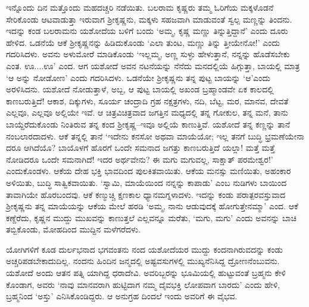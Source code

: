 ಇನ್ನೊಂದು ದಿನ ಮತ್ತೊಂದು ಮಹದಚ್ಚರಿ ನಡೆಯಿತು. ಬಲರಾಮ ಕೃಷ್ಣರು ತಮ್ಮ ಓರಿಗೆಯ ಮಕ್ಕಳೊಡನೆ ಸೇರಿಕೊಂಡು ಆಟವಾಡುತ್ತಾ ಇರುವಾಗ ಶ್ರೀಕೃಷ್ಣನು, ಮಕ್ಕಳು ಸಹಜವಾಗಿ ಮಾಡುವಂತೆ ಸ್ವಲ್ಪ ಮಣ್ಣನ್ನು ತಿಂದನು. ಇದನ್ನು ಕಂಡ ಬಲರಾಮನು ಯಶೋದೆಯ ಬಳಿಗೆ ಬಂದು ‘ಅಮ್ಮ, ಕೃಷ್ಣ ಮಣ್ಣು ತಿನ್ನುತ್ತಿದ್ದಾನೆ’ ಎಂದು ದೂರು ಹೇಳಿದ. ಒಡನೆಯೆ ಆಕೆ ಶ್ರೀಕೃಷ್ಣನನ್ನು ಹಿಡಿದುಕೊಂಡು ‘ಎಲಾ ತುಂಟ, ಮಣ್ಣು ತಿನ್ನು ತ್ತೀಯೇನೋ!’ ಎಂದು ಗದರಿಸಿದಳು. ಅವನು ಅಳುಮೋರೆ ಮಾಡಿಕೊಂಡು ‘ಇಲ್ಲಮ್ಮ, ಅಣ್ಣ ಸುಳ್ಳು ಹೇಳುತ್ತಾನೆ, ನನ್ನನ್ನು ಹೊಡೆಸಬೇಕು ಎಂತ. ಊ....ಊ’ ಎಂದ. ಆಗ ಯಶೋದೆ ಅವನ ನಟನೆಯನ್ನು ನೆನೆದು ಮನದಲ್ಲಿಯೆ ಹಿಗ್ಗುತ್ತಾ, ಬಾಯಲ್ಲಿ ಮಾತ್ರ ‘ಆ ಅನ್ನು ನೋಡೋಣ’ ಎಂದು ಗದರಿಸಿದಳು. ಒಡನೆಯೇ ಶ್ರೀಕೃಷ್ಣನು ತನ್ನ ಪುಟ್ಟ ಬಾಯನ್ನು ‘ಆ’ಎಂದು ಅರಳಿಸಿದನು. ಯಶೋದೆ ನೋಡುತ್ತಾಳೆ, ಅಬ್ಬ, ಆ ಪುಟ್ಟ ಬಾಯಲ್ಲಿ ಅಖಂಡ ಬ್ರಹ್ಮಾಂಡವೇ ಏಕ ಕಾಲದಲ್ಲಿ ಕಾಣಬರುತ್ತಿದೆ! ಆಕಾಶ, ದಿಕ್ಕುಗಳು, ಸೂರ್ಯ ಚಂದ್ರಾದಿ ಗ್ರಹ ನಕ್ಷತ್ರಗಳು, ನದಿ, ಬೆಟ್ಟ, ಮರ, ಮಾನವ, ದೇವತೆ ಎಲ್ಲವೂ, ಎಲ್ಲವೂ ಅಲ್ಲಿಯೇ ಇವೆ. ಆ ಚಿತ್ರವಿಚಿತ್ರವಾದ ಜಗತ್ತಿನ ಮಧ್ಯದಲ್ಲಿ ತನ್ನ ಗೋಕುಲ, ತನ್ನ ಮನೆ, ತಾನು ಬಾಯ್ದೆರೆದುಕೊಂಡು ನಿಂತಿರುವ ತನ್ನ ಕಂದ ಶ್ರೀಕೃಷ್ಣ–ಇವೂ ಅಲ್ಲಿಯೆ ಕಾಣುತ್ತಿವೆ. ಯಶೋದೆ ತನ್ನ ಕಣ್ಣನ್ನು ತಾನೆ ನಂಬಲಾರದಾದಳು. ಆಕೆ ತನ್ನಲ್ಲಿ ತಾನೆ ‘ಇದೇನು ಕನಸೋ ಅಥವಾ ಮಾಯೆಯೋ; ಇಲ್ಲ ತನಗೆ ಬುದ್ಧಿ ಭ್ರಮಣೆಯೇನಾ ದರೂ ಆಗಿದೆಯೊ? ಬಾಯೊಳಗೆ ಹೊರಗೆ ಒಂದೇ ಸಮನಾದ ಜಗತ್ತು ಕಾಣಬರುತ್ತಿದೆ ಯಲ್ಲಾ! ಮತ್ತೆ ಮತ್ತೆ ನೋಡಿದರೂ ಒಂದೇ ಸಮನಾಗಿದೆ! ಇದರ ಅರ್ಥವೇನು? ಈ ಮಗು ಮಗುವಲ್ಲ, ಸಾಕ್ಷಾತ್ ಪರಮೇಶ್ವರ!’ ಎಂದುಕೊಂಡಳು. ಆಕೆಯ ದೇಹ ಭಕ್ತಿ ಭಾವದಿಂದ ಪುಲಕಿತವಾಯಿತು. ಆಕೆಯ ಮನಸ್ಸು ಮಣಿಯಿತು, ಅಹಂಕಾರ ಅಳಿಯಿತು, ಬುದ್ಧಿ ಸಾತ್ವಿಕವಾಯಿತು. ‘ಸ್ವಾಮಿ, ಮಾಯೆಯಿಂದ ನನ್ನನ್ನು ಕಾಪಾಡು’ ಎಂಬ ನುಡಿಗಳು ಬಾಯಿಂದ ತಾವಾಗಿಯೇ ಹೊರಬಂದವು. ಆಕೆ ಕಣ್ಮುಚ್ಚಿ ಕ್ಷಣಕಾಲ ಧ್ಯಾನಮಗ್ನಳಾದಳು. ಇದನ್ನು ಕಂಡು ಪರಾತ್ಪರವಸ್ತುವಾದ ಶ್ರೀಕೃಷ್ಣನು ತನ್ನ ಮಾಯೆಯನ್ನು ಆಕೆಯ ಮೇಲೆ ಹರಡಿ ‘ಅಮ್ಮ, ನಾನು ಆಡುವುದಕ್ಕೆ ಹೋಗುತ್ತೇನಮ್ಮಾ’ ಎಂದ. ಆಕೆ ಕಣ್ದೆರೆದು, ಕೃಷ್ಣನ ಮುದ್ದು ಮುಖವನ್ನು ಕಾಣುತ್ತಲೆ ಎಲ್ಲವನ್ನೂ ಮರೆತು, ‘ಮಗು, ಮಗು’ ಎಂದು ಅವನನ್ನು ಬಾಚಿ ತಬ್ಬಿಕೊಂಡು, ಮೋಹದಿಂದ ಮುದ್ದಿನ ಮಳೆಗರೆದಳು.

ಯೋಗಿಗಳಿಗೆ ಕೂಡ ದುರ್ಲಭನಾದ ಭಗವಂತನು ನಂದ ಯಶೋದೆಯರ ಮುದ್ದು ಕಂದನಾಗಿರುವದನ್ನು ಕಂಡು ಅಚ್ಚರಿಪಡಬೇಕಾದುದಿಲ್ಲ. ನಂದನು ಹಿಂದಿನ ಜನ್ಮದಲ್ಲಿ ಅಷ್ಟವಸುಗಳಲ್ಲಿ ಮುಖ್ಯನೆನಿಸಿದ್ದ ದ್ರೋಣನೆಂಬುವನು. ಯಶೋದೆ ಅಂದು ಆತನ ಪತ್ನಿ ಯಾಗಿದ್ದ ಧರಾದೇವಿ. ಅವರಿಬ್ಬರನ್ನು ಭೂಮಿಯಲ್ಲಿ ಹುಟ್ಟುವಂತೆ ಬ್ರಹ್ಮನು ಕೇಳಿ ಕೊಂಡಾಗ, ಅವರು ‘ನಾವು ಮಾನವರಾಗಿ ಹುಟ್ಟಿದಾಗ ನಮ್ಮ ದೈವಭಕ್ತಿ ಲೋಪವಾಗ ಬಾರದು’ ಎಂದು ಹೇಳಿ, ಬ್ರಹ್ಮನಿಂದ ‘ಅಸ್ತು’ ಎನಿಸಿಕೊಂಡಿದ್ದರು. ಆ ಅನುಗ್ರಹ ದಿಂದಲೆ ಇಂದು ಅವರಿಗೆ ಈ ವೈಭವ.


